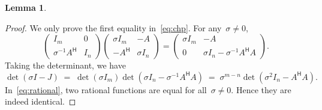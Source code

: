\documentclass[11pt,a4paper]{article}
\newtheorem{lemma}{Lemma}%
\theoremstyle{definition}
\newcommand{\hmt}{{\scriptscriptstyle{{\mathsf{H}}}}}
\begin{document}
\begin{lemma}
\end{lemma}

\begin{proof}
  We only prove the first equality in~\eqref{eq:chp}. For any~$\sigma \neq 0$,
  \begin{equation*}
    \begin{pmatrix}
      I_m & 0 \\
      \sigma^{-1}A^\hmt & I_n 
    \end{pmatrix}
    \begin{pmatrix}
      \sigma I_m & -A \\
      -A^\hmt & \sigma I_n
    \end{pmatrix}
    =
    \begin{pmatrix}
      \sigma I_m & -A\\
      0 & \sigma I_n - \sigma^{-1}A^\hmt A 
    \end{pmatrix}.
  \end{equation*}
  Taking the determinant, we have
  \begin{equation}
    \label{eq:rational}
    \det(\sigma I - J) \;=\; \det(\sigma I_m) \det(\sigma I_n - \sigma^{-1}A^\hmt A) \;=\;
    \sigma^{m-n} \det(\sigma^2 I_n -A^\hmt A). 
  \end{equation}
  In~\eqref{eq:rational}, two rational functions are equal for all~$\sigma \neq 0$. 
  Hence they are indeed identical.
\end{proof}
\end{document}
